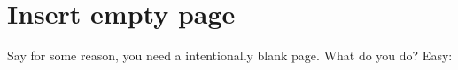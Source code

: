 \chapter{Insert empty page}

Say for some reason, you need a intentionally blank page. What do you do? Easy:

\insertEmptyPage
